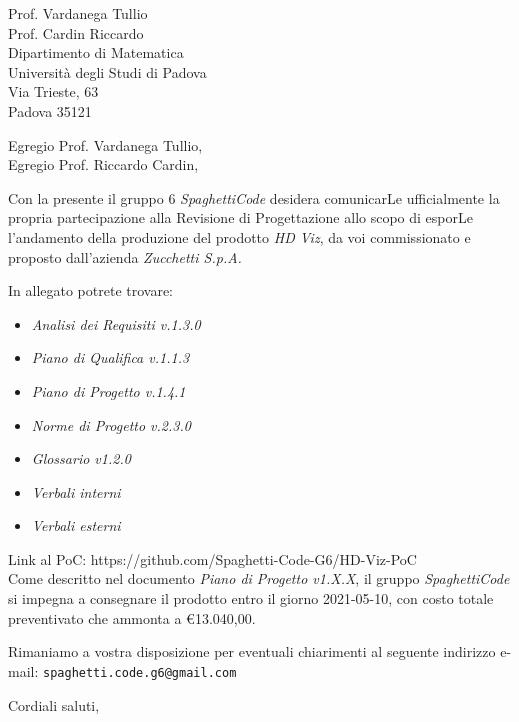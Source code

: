 \documentclass[a4paper,12pt]{letteracdp}
\date{10 marzo 2021}
\begin{document}
\begin{letter}{
		\vspace*{-2\baselineskip}
		Prof. Vardanega Tullio \\
		Prof. Cardin Riccardo \\
		Dipartimento di Matematica \\
		Università degli Studi di Padova \\
		Via Trieste, 63 \\
		Padova 35121}

	\opening{Egregio Prof. Vardanega Tullio, \\
	\noindent Egregio Prof. Riccardo Cardin,}

	\begin{flushleft}
		Con la presente il gruppo 6 \textit{SpaghettiCode} desidera comunicarLe ufficialmente la propria partecipazione alla Revisione di Progettazione allo scopo di esporLe l'andamento della produzione del prodotto 
        \textit{HD Viz}, da voi commissionato e proposto dall'azienda \textit{Zucchetti S.p.A.}
        
		In allegato potrete trovare:
	\end{flushleft}

	\begin{itemize}
		\item \emph{Analisi dei Requisiti v.1.3.0}
		\item \emph{Piano di Qualifica v.1.1.3}
		\item \emph{Piano di Progetto v.1.4.1}
		\item \emph{Norme di Progetto v.2.3.0}
		\item \emph{Glossario v1.2.0}
		\item \emph{Verbali interni}
		\item \emph{Verbali esterni}
	\end{itemize}
	
	\begin{flushleft}
		Link al PoC: https://github.com/Spaghetti-Code-G6/HD-Viz-PoC \\
		Come descritto nel documento \emph{Piano di Progetto v1.X.X}, il gruppo \textit{SpaghettiCode} si impegna a consegnare il prodotto entro il giorno 2021-05-10, con costo totale preventivato che ammonta a \euro{13.040,00}.

		Rimaniamo a vostra disposizione per eventuali chiarimenti al seguente indirizzo e-mail: {\texttt{spaghetti.code.g6@gmail.com}}
	\end{flushleft}

	\closing{Cordiali saluti,}

\end{letter}
\end{document}
